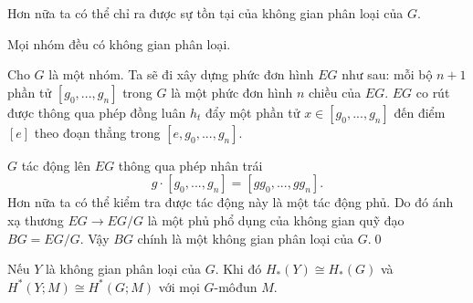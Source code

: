 Hơn nữa ta có thể chỉ ra được sự tồn tại của không gian phân loại của $G$.


\begin{proposition}
    Mọi nhóm đều có không gian phân loại.
\end{proposition}
\startproof Cho $G$ là một nhóm. Ta sẽ đi xây dựng phức đơn hình $EG$ như sau: mỗi bộ $n+1$ phần tử $[g_0,...,g_n]$ trong $G$ là một phức đơn hình $n$ chiều của $EG$. $EG$ co rút được thông qua phép đồng luân $h_t$ đẩy một phần tử $x \in [g_0,...,g_n]$ đến điểm $[e]$ theo đoạn thẳng trong $[e,g_0,...,g_n]$.

$G$ tác động lên $EG$ thông qua phép nhân trái
$$
    g \cdot [g_0,...,g_n] = [gg_0,...,gg_n].
$$
Hơn nữa ta có thể kiểm tra được tác động này là một tác động phủ. Do đó ánh xạ thương $EG \rightarrow EG / G$ là một phủ phổ dụng của không gian quỹ đạo $BG = EG/G$. Vậy $BG$ chính là một không gian phân loại của $G$.\qed

\begin{proposition}
    Nếu $Y$ là không gian phân loại của $G$. Khi đó $H_*(Y) \cong H_*(G)$ và $H^*(Y;M) \cong H^*(G;M)$ với mọi $G$-môđun $M$.
\end{proposition}

